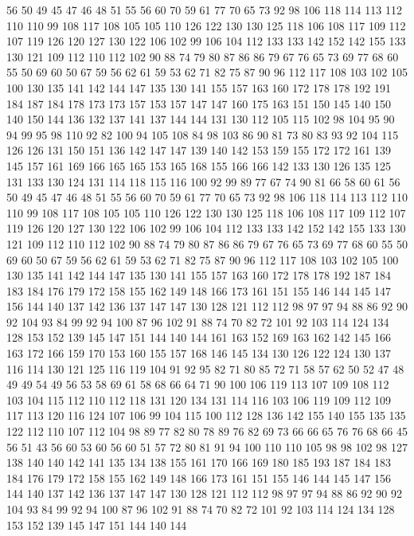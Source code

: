 56 50 49 45 47 46 48 51 55 56 60 70 59 61 77 70 65 73 92 98
106 118 114 113 112 110 110 99 108 117 108 105 105 110 126 122 130 130 125 118
106 108 117 109 112 107 119 126 120 127 130 122 106 102 99 106 104 112 133 133
142 152 142 155 133 130 121 109 112 110 112 102 90 88 74 79 80 87 86 86
79 67 76 65 73 69 77 68 60 55 50 69 60 50 67 59 56 62 61 59
53 62 71 82 75 87 90 96 112 117 108 103 102 105 100 130 135 141 142 144
147 135 130 141 155 157 163 160 172 178 178 192 191 184 187 184 178 173 173 157
153 157 147 147 160 175 163 151 150 145 140 150 140 150 144 136 132 137 141 137
144 144 131 130 112 105 115 102 98 104 95 90 94 99 95 98 110 92 82 100
94 105 108 84 98 103 86 90 81 73 80 83 93 92 104 115 126 126 131 150
151 136 142 147 147 139 140 142 153 159 155 172 172 161 139 145 157 161 169 166
165 165 153 165 168 155 166 166 142 133 130 126 135 125 131 133 130 124 131 114
118 115 116 100 92 99 89 77 67 74 90 81 66 58 60 61 56 50 49 45
47 46 48 51 55 56 60 70 59 61 77 70 65 73 92 98 106 118 114 113
112 110 110 99 108 117 108 105 105 110 126 122 130 130 125 118 106 108 117 109
112 107 119 126 120 127 130 122 106 102 99 106 104 112 133 133 142 152 142 155
133 130 121 109 112 110 112 102 90 88 74 79 80 87 86 86 79 67 76 65
73 69 77 68 60 55 50 69 60 50 67 59 56 62 61 59 53 62 71 82
75 87 90 96 112 117 108 103 102 105 100 130 135 141 142 144 147 135 130 141
155 157 163 160 172 178 178 192 187 184 183 184 176 179 172 158 155 162 149 148
166 173 161 151 155 146 144 145 147 156 144 140 137 142 136 137 147 147 130 128
121 112 112 98 97 97 94 88 86 92 90 92 104 93 84 99 92 94 100 87
96 102 91 88 74 70 82 72 101 92 103 114 124 134 128 153 152 139 145 147
151 144 140 144 161 163 152 169 163 162 142 145 166 163 172 166 159 170 153 160
155 157 168 146 145 134 130 126 122 124 130 137 116 114 130 121 125 116 119 104
91 92 95 82 71 80 85 72 71 58 57 62 50 52 47 48 49 49 54 49
56 53 58 69 61 58 68 66 64 71 90 100 106 119 113 107 109 108 112 103
104 115 112 110 112 118 131 120 134 131 114 116 103 106 119 109 112 109 117 113
120 116 124 107 106 99 104 115 100 112 128 136 142 155 140 155 135 135 122 112
110 107 112 104 98 89 77 82 80 78 89 76 82 69 73 66 66 65 76 76
68 66 45 56 51 43 56 60 53 60 56 60 51 57 72 80 81 91 94 100
110 110 105 98 98 102 98 127 138 140 140 142 141 135 134 138 155 161 170 166
169 180 185 193 187 184 183 184 176 179 172 158 155 162 149 148 166 173 161 151
155 146 144 145 147 156 144 140 137 142 136 137 147 147 130 128 121 112 112 98
97 97 94 88 86 92 90 92 104 93 84 99 92 94 100 87 96 102 91 88
74 70 82 72 101 92 103 114 124 134 128 153 152 139 145 147 151 144 140 144
